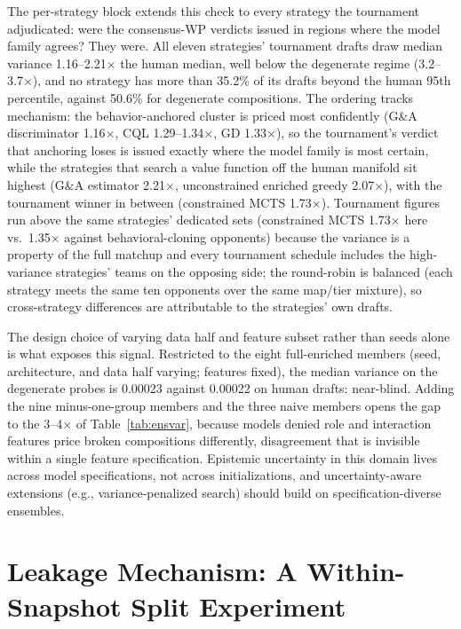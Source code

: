 \documentclass[journal]{IEEEtran}
\newcommand{\added}[1]{{\color{blue}#1}}
\newcommand{\added}[1]{#1}
\begin{document}
The per-strategy block extends this check to every strategy the tournament adjudicated: were the consensus-WP verdicts issued in regions where the model family agrees? They were. All eleven strategies' tournament drafts draw median variance 1.16--2.21$\times$ the human median, well below the degenerate regime (3.2--3.7$\times$), and no strategy has more than 35.2\% of its drafts beyond the human 95th percentile, against 50.6\% for degenerate compositions. The ordering tracks mechanism: the behavior-anchored cluster is priced most confidently (G\&A discriminator 1.16$\times$, CQL 1.29--1.34$\times$, GD 1.33$\times$), so the tournament's verdict that anchoring loses is issued exactly where the model family is most certain, while the strategies that search a value function off the human manifold sit highest (G\&A estimator 2.21$\times$, unconstrained enriched greedy 2.07$\times$), with the tournament winner in between (constrained MCTS 1.73$\times$). Tournament figures run above the same strategies' dedicated sets (constrained MCTS 1.73$\times$ here vs.\ 1.35$\times$ against behavioral-cloning opponents) because the variance is a property of the full matchup and every tournament schedule includes the high-variance strategies' teams on the opposing side; the round-robin is balanced (each strategy meets the same ten opponents over the same map/tier mixture), so cross-strategy differences are attributable to the strategies' own drafts.

The design choice of varying data half and feature subset rather than seeds alone is what exposes this signal. Restricted to the eight full-enriched members (seed, architecture, and data half varying; features fixed), the median variance on the degenerate probes is 0.00023 against 0.00022 on human drafts: near-blind. Adding the nine minus-one-group members and the three naive members opens the gap to the 3--4$\times$ of Table~\ref{tab:ensvar}, because models denied role and interaction features price broken compositions differently, disagreement that is invisible within a single feature specification. Epistemic uncertainty in this domain lives across model specifications, not across initializations, and uncertainty-aware extensions (e.g., variance-penalized search) should build on specification-diverse ensembles.

\section{\added{Leakage Mechanism: A Within-Snapshot Split Experiment}}
\label{sec:split}
\end{document}
